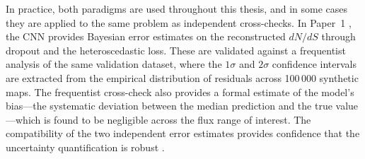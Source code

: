 In practice, both paradigms are used throughout this thesis, and in some cases they are applied to the same problem as independent cross-checks. In Paper~1 \cite{Amerio:2023dns}, the CNN provides Bayesian error estimates on the reconstructed $dN/dS$ through dropout and the heteroscedastic loss. These are validated against a frequentist analysis of the same validation dataset, where the $1\sigma$ and $2\sigma$ confidence intervals are extracted from the empirical distribution of residuals across 100\,000 synthetic maps. The frequentist cross-check also provides a formal estimate of the model's bias---the systematic deviation between the median prediction and the true value---which is found to be negligible across the flux range of interest. The compatibility of the two independent error estimates provides confidence that the uncertainty quantification is robust \cite{Amerio:2023dns}.
